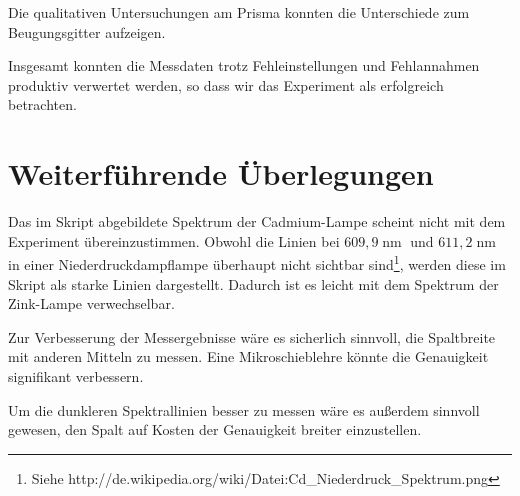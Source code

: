 \documentclass[a4paper,german,12pt,smallheadings]{scrartcl}
\begin{document}
Die qualitativen Untersuchungen am Prisma konnten die Unterschiede zum
Beugungsgitter aufzeigen.

Insgesamt konnten die Messdaten trotz Fehleinstellungen und Fehlannahmen
produktiv verwertet werden, so dass wir das Experiment als erfolgreich
betrachten.

\section{Weiterführende Überlegungen}
Das im Skript abgebildete Spektrum der Cadmium-Lampe scheint nicht mit dem
Experiment übereinzustimmen. Obwohl die Linien bei $609{,}9 \operatorname{nm}$
und $611{,}2 \operatorname{nm}$ in einer Niederdruckdampflampe überhaupt nicht
sichtbar sind\footnote{Siehe
http://de.wikipedia.org/wiki/Datei:Cd\_Niederdruck\_Spektrum.png}, werden diese
im Skript als starke Linien dargestellt. Dadurch ist es leicht mit dem Spektrum
der Zink-Lampe verwechselbar.

Zur Verbesserung der Messergebnisse wäre es sicherlich sinnvoll, die
Spaltbreite mit anderen Mitteln zu messen. Eine Mikroschieblehre könnte die
Genauigkeit signifikant verbessern.

Um die dunkleren Spektrallinien besser zu messen wäre es außerdem sinnvoll
gewesen, den Spalt auf Kosten der Genauigkeit breiter einzustellen.
\end{document}
